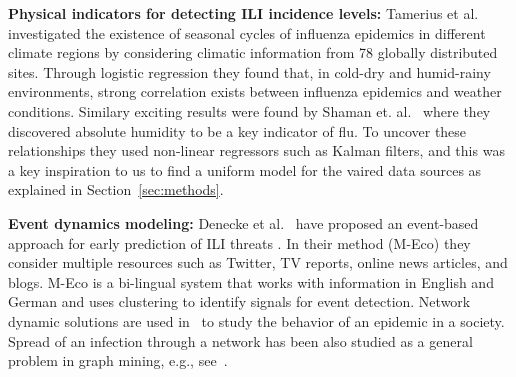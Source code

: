 \textbf{Physical indicators for detecting ILI incidence levels:} 
Tamerius et al.~\cite{ref9} investigated the existence of seasonal 
cycles of influenza epidemics in different climate regions
by considering climatic information from 78 globally distributed sites. Through 
logistic regression they found that, in cold-dry and humid-rainy
environments, strong correlation exists between influenza epidemics and
weather conditions. Similary exciting results were found 
by Shaman et. al.~\cite{Shaman_orig_humidity_link, Shaman_humidity_USA}
where they discovered absolute humidity to be a key indicator of flu. To uncover 
these relationships they used non-linear regressors such as Kalman filters,
and this was a key inspiration to us to find a uniform model for the
vaired data sources as explained in Section~\ref{sec:methods}.

%
\textbf{Event dynamics modeling:}
Denecke et al.~\cite{ref3}
have proposed an event-based approach for early prediction
of ILI threats \cite{ref3}. In their method (M-Eco) they consider
multiple resources such as Twitter, TV reports, online news articles,
and blogs. M-Eco is a bi-lingual system that works with information in
English and German and uses clustering to identify signals for event detection.
Network dynamic solutions are used in~\cite{ref11} 
to study the behavior of an epidemic in a society. Spread of an infection through a network 
has been also studied as a general problem in graph mining, e.g., see~\cite{ref13,ref14}.
 
